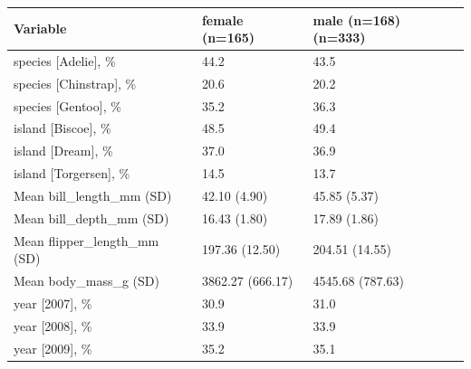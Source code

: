\documentclass[
  man,
  longtable,
  a4paper,
  nolmodern,
  notxfonts,
  notimes,
  colorlinks=true,linkcolor=blue,citecolor=blue,urlcolor=blue]{apa7}
\begin{document}
\begin{table}

{\caption{{Descriptive Statistics}{\label{tbl-descriptive-statistics}}}
\vspace{-20pt}}

\begin{longtable}[]{@{}lll@{}}
\toprule\noalign{}
Variable & female (n=165) & male (n=168) (n=333) \\
\midrule\noalign{}
\endhead
\bottomrule\noalign{}
\endlastfoot
species {[}Adelie{]}, \% & 44.2 & 43.5 \\
species {[}Chinstrap{]}, \% & 20.6 & 20.2 \\
species {[}Gentoo{]}, \% & 35.2 & 36.3 \\
island {[}Biscoe{]}, \% & 48.5 & 49.4 \\
island {[}Dream{]}, \% & 37.0 & 36.9 \\
island {[}Torgersen{]}, \% & 14.5 & 13.7 \\
Mean bill\_length\_mm (SD) & 42.10 (4.90) & 45.85 (5.37) \\
Mean bill\_depth\_mm (SD) & 16.43 (1.80) & 17.89 (1.86) \\
Mean flipper\_length\_mm (SD) & 197.36 (12.50) & 204.51 (14.55) \\
Mean body\_mass\_g (SD) & 3862.27 (666.17) & 4545.68 (787.63) \\
year {[}2007{]}, \% & 30.9 & 31.0 \\
year {[}2008{]}, \% & 33.9 & 33.9 \\
year {[}2009{]}, \% & 35.2 & 35.1 \\
\end{longtable}

\end{table}
\end{document}
